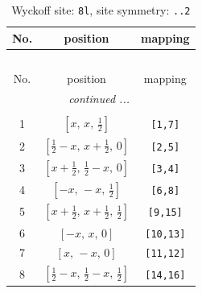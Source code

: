 \documentclass[fleqn,8pt]{jsarticle}
\begin{document}
\begin{longtable}{ccc}
\caption{Wyckoff site: {\tt 8l}, site symmetry: {\tt ..2}}
 \\
 \hline \hline
No. & position & mapping \\ \hline \endfirsthead

\multicolumn{2}{l}{\tablename\ \thetable{}} \\
 \hline \hline
No. & position & mapping \\ \hline \endhead

 \hline \hline
\multicolumn{2}{r}{\footnotesize\it continued ...} \\ \endfoot

 \hline \hline
\multicolumn{2}{r}{} \\ \endlastfoot

1 & $\left[ x,\, x,\, \frac{1}{2} \right]$ & {\tt [1,7]} \\ \hline
2 & $\left[ \frac{1}{2} - x,\, x + \frac{1}{2},\, 0 \right]$ & {\tt [2,5]} \\ \hline
3 & $\left[ x + \frac{1}{2},\, \frac{1}{2} - x,\, 0 \right]$ & {\tt [3,4]} \\ \hline
4 & $\left[ - x,\, - x,\, \frac{1}{2} \right]$ & {\tt [6,8]} \\ \hline
5 & $\left[ x + \frac{1}{2},\, x + \frac{1}{2},\, \frac{1}{2} \right]$ & {\tt [9,15]} \\ \hline
6 & $\left[ - x,\, x,\, 0 \right]$ & {\tt [10,13]} \\ \hline
7 & $\left[ x,\, - x,\, 0 \right]$ & {\tt [11,12]} \\ \hline
8 & $\left[ \frac{1}{2} - x,\, \frac{1}{2} - x,\, \frac{1}{2} \right]$ & {\tt [14,16]} \\
\end{longtable}
\renewcommand{\arraystretch}{1.2}
\end{document}
